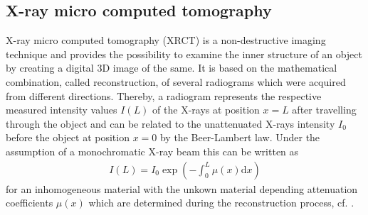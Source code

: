\subsection{X-ray micro computed tomography}
\label{subsec:structure}
X-ray micro computed tomography ({\textmu}XRCT) is a non-destructive imaging technique and provides the possibility to examine the inner structure of an object by creating a digital 3D image of the same. It is based on the mathematical combination, called reconstruction, of several radiograms which were acquired from different directions. Thereby, a radiogram represents the respective measured intensity values $I(L)$ of the X-rays at position $x = L$ after travelling through the object and can be related to the unattenuated X-rays intensity $I_0$ before the object at position $x = 0$ by the Beer-Lambert law. Under the assumption of a monochromatic X-ray beam this can be written as 
\begin{align*}
I(L) = I_0 \exp\left(-\int_0^L \mu(x) \mathrm{d}x \right)
\end{align*}
for an inhomogeneous material with the unkown material depending attenuation coefficients $\mu(x)$ which are determined during the reconstruction process, cf. \cite{Carmignato2018}.

